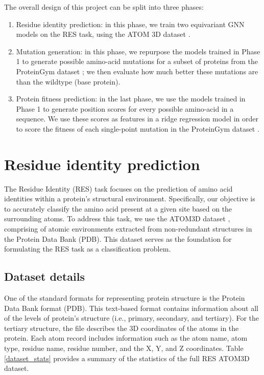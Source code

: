 The overall design of this project can be split into three phases:

\begin{enumerate}
    \item Residue identity prediction: in this phase, we train two equivariant GNN models on the RES task, using the ATOM 3D dataset \cite{atom-3d}.
    \item Mutation generation: in this phase, we repurpose the models trained in Phase 1 to generate possible amino-acid mutations for a subset of proteins from the ProteinGym dataset \cite{tranception}; we then evaluate how much better these mutations are than the wildtype (base protein). 
    \item Protein fitness prediction: in the last phase, we use the models trained in Phase 1 to generate position scores for every possible amino-acid in a sequence. We use these scores as features in a ridge regression model in order to score the fitness of each single-point mutation in the ProteinGym dataset \cite{tranception}.
\end{enumerate}

\section{Residue identity prediction}
The Residue Identity (RES) task focuses on the prediction of amino acid identities within a protein's structural environment. Specifically, our objective is to accurately classify the amino acid present at a given site based on the surrounding atoms. To address this task, we use the ATOM3D dataset \cite{atom-3d}, comprising of atomic environments extracted from non-redundant structures in the Protein Data Bank (PDB). This dataset serves as the foundation for formulating the RES task as a classification problem. 

\subsection{Dataset details}
One of the standard formats for representing protein structure is the Protein Data Bank format (PDB). This text-based format contains information about all of the levels of protein's structure (i.e., primary, secondary, and tertiary). For the tertiary structure, the file describes the 3D coordinates of the atoms in the protein. Each atom record includes information such as the atom name, atom type, residue name, residue number, and the X, Y, and Z coordinates. Table \ref{dataset_stats} provides a summary of the statistics of the full RES ATOM3D dataset.

